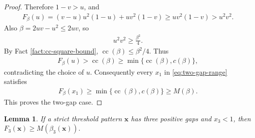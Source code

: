 \documentclass[10pt,a4paper]{article}
\newtheorem{lemma}[definition]{Lemma}
\newcommand{\cc}{\operatorname{cc}}
\begin{document}
\begin{proof}
Therefore $1-v>u$, and
\begin{align*}
  F_\beta(u)=(v-u)u^2(1-u)+uv^2(1-v)\ge uv^2(1-v)>u^2v^2.
\end{align*}
Also $\beta=2uv-u^2\le2uv$, so
\begin{align*}
  u^2v^2\ge \frac{\beta^2}{4}.
\end{align*}
By Fact \ref{fact:cc-square-bound}, $\cc(\beta)\le\beta^2/4$.  Thus
\begin{align*}
  F_\beta(u)>\cc(\beta)\ge\min\{\cc(\beta),c(\beta)\},
\end{align*}
contradicting the choice of $u$.  Consequently every $x_1$ in \eqref{eq:two-gap-range} satisfies
\begin{align*}
  F_\beta(x_1)\ge\min\{\cc(\beta),c(\beta)\}\ge M(\beta).
\end{align*}
This proves the two-gap case.
\end{proof}

\begin{lemma}\label{lem:three-gaps}
If a strict threshold pattern $\mathbf{x}$ has three positive gaps and $x_3<1$, then $F_3(\mathbf{x})\ge M(\beta_3(\mathbf{x}))$.
\end{lemma}
\end{document}
